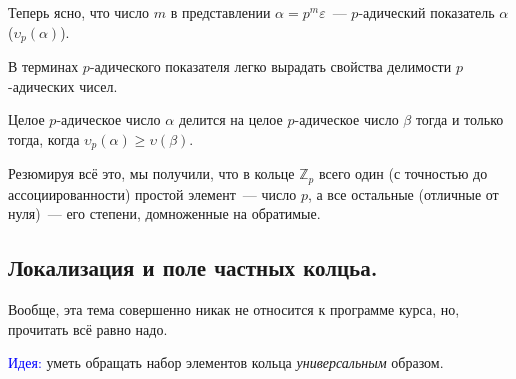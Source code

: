 \documentclass[11pt]{article}
\begin{document}
    Теперь ясно, что число $m$ в представлении $\alpha = p^m \varepsilon$~--- $p$-адический показатель $\alpha$ ($\upsilon_p(\alpha)$).

    В терминах $p$-адического показателя легко вырадать свойства делимости $p$-адических чисел.
    \begin{corollary}
        Целое $p$-адическое число $\alpha$ делится на целое $p$-адическое число $\beta$ тогда и только тогда, когда
        $\upsilon_p(\alpha) \ge \upsilon(\beta)$.
     \end{corollary}

    Резюмируя всё это, мы получили, что в кольце $\mathbb{Z}_p$ всего один (с точностью до ассоциированности) простой элемент~--- число $p$,
    а все остальные (отличные от нуля)~--- его степени, домноженные на обратимые.
    \subsection{Локализация и поле частных колцьа.}

    Вообще, эта тема совершенно никак не относится к программе курса, но, прочитать всё равно надо.

    \textcolor{blue}{Идея:} уметь обращать набор элементов кольца \emph{универсальным} образом. \\
\end{document}
